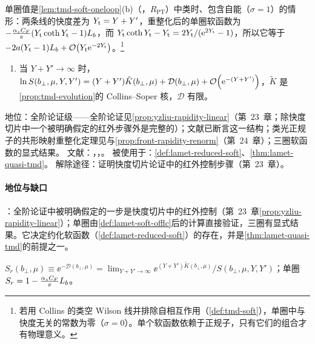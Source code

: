 单圈值是\cref{lem:tmd-soft-oneloop}(b)（\tagR，$R_{\mathrm{PT}}$）中类时、包含自能（$\sigma=1$）的情形：两条线的快度差为 $Y_{\rm t}=Y+Y'$，重整化后的单圈软函数为 $-\frac{\alpha_s C_F}\pi(Y_{\rm t}\coth Y_{\rm t}-1)L_b$，而 $Y_{\rm t}\coth Y_{\rm t}-Y_{\rm t}=2Y_{\rm t}/(\mathrm{e}^{2Y_{\rm t}}-1)$，所以它等于 $-2a(Y_{\rm t}-1)L_b+\mathcal{O}\!\left(Y_{\rm t}\mathrm{e}^{-2Y_{\rm t}}\right)$。\footnote{若用 Collins 的类空 Wilson 线并排除自相互作用（\cref{def:tmd-soft}），单圈中与快度无关的常数为零（$\sigma=0$）。单个软函数依赖于正规子，只有它们的组合才有物理意义。}

\begin{assumption}\label{asm:lamet-soft-rapidity}
\begin{enumerate}[label=(SR),leftmargin=3.2em,itemsep=1pt,topsep=2pt]
\item 当 $Y+Y'\to\infty$ 时，$\ln S(b_\perp,\mu,Y,Y')=(Y+Y')\tilde K(b_\perp,\mu)+\mathcal D(b_\perp,\mu)+\mathcal{O}\!\left(\mathrm{e}^{-(Y+Y')}\right)$，$\tilde K$ 是\cref{prop:tmd-evolution}的 Collins--Soper 核，$\mathcal D$ 有限。
\end{enumerate}
地位：全阶论证级——全阶论证见\cref{prop:yzliu-rapidity-linear}（第~23~章；除快度切片中一个被明确假定的红外步骤外是完整的）；文献\cite{CollinsSoper1981}已断言这一结构；类光正规子的共形映射重整化定理见\cite{Vladimirov:2017ksc}与\cref{prop:front-rapidity-renorm}（第~24~章）；三圈软函数的显式结果\cite{Li:2016axz}。
文献：\cite{Ji:2019sxk}，\cite[附录~E]{Liu:2022nnk}，\cite{CollinsSoper1981,Vladimirov:2017ksc,Li:2016axz}。
被使用于：\cref{def:lamet-reduced-soft}、\cref{thm:lamet-quasi-tmd}。
解除途径：证明快度切片论证中的红外控制步骤（第~23~章）。
\end{assumption}

\paragraph{地位与缺口}
\tagA：全阶论证中被明确假定的一步是快度切片中的红外控制（第~23~章\cref{prop:yzliu-rapidity-linear}）；单圈由\cref{def:lamet-soft-offlc}后的计算直接验证，三圈有显式结果\cite{Li:2016axz}。它决定约化软函数（\cref{def:lamet-reduced-soft}）的存在，并是\cref{thm:lamet-quasi-tmd}的前提之一。

\begin{definition}[约化软函数 $S_r$]\label{def:lamet-reduced-soft}
$S_r(b_\perp,\mu)\equiv\ee^{-\mathcal D(b_\perp,\mu)}=\lim_{Y+Y'\to\infty}\ee^{(Y+Y')\tilde K(b_\perp,\mu)}/S(b_\perp,\mu,Y,Y')$；单圈 $S_r=1-\frac{\alpha_s C_F}\pi L_b$。%
\end{definition}

